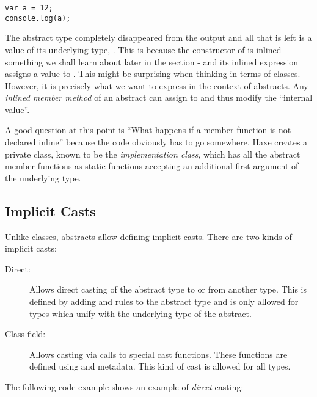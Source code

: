 \begin{lstlisting}
var a = 12;
console.log(a);
\end{lstlisting}
The abstract type  completely disappeared from the output and all that is left is a value of its underlying type, . This is because the constructor of  is inlined - something we shall learn about later in the section  - and its inlined expression assigns a value to . This might be surprising when thinking in terms of classes. However, it is precisely what we want to express in the context of abstracts. Any \emph{inlined member method} of an abstract can assign to  and thus modify the ``internal value''.


A good question at this point is ``What happens if a member function is not declared inline'' because the code obviously has to go somewhere. Haxe creates a private class, known to be the \emph{implementation class}, which has all the abstract member functions as static functions accepting an additional first argument  of the underlying type.







\subsection{Implicit Casts}
\label{types-abstract-implicit-casts}

Unlike classes, abstracts allow defining implicit casts. There are two kinds of implicit casts:

\begin{description}
	\item[Direct:] Allows direct casting of the abstract type to or from another type. This is defined by adding  and  rules to the abstract type and is only allowed for types which unify with the underlying type of the abstract.
	\item[Class field:] Allows casting via calls to special cast functions. These functions are defined using  and  metadata. This kind of cast is allowed for all types.
\end{description}
The following code example shows an example of \emph{direct} casting:

